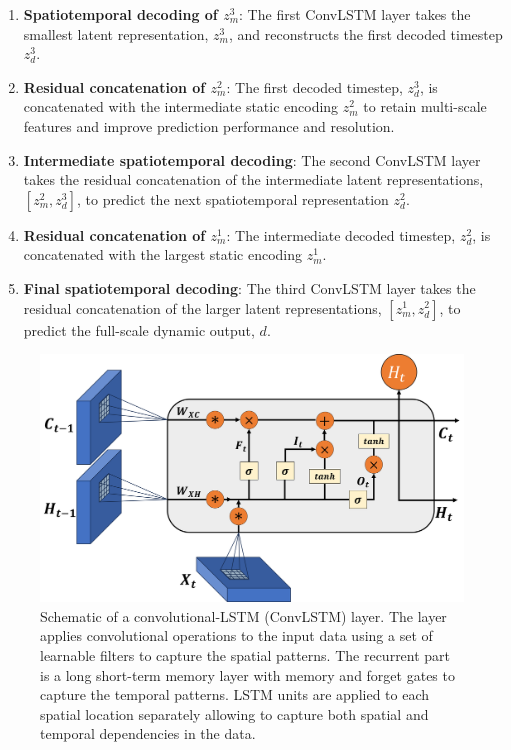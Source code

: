 \documentclass[10pt, twoside]{article}
\begin{document}
\begin{enumerate}[Step 1:]\addtocounter{enumi}{5}
    \item \textbf{Spatiotemporal decoding of $z_m^3$}: The first ConvLSTM layer takes the smallest latent representation, $z_m^3$, and reconstructs the first decoded timestep $z_d^3$.
    
    \item \textbf{Residual concatenation of $z_m^2$}: The first decoded timestep, $z_d^3$, is concatenated with the intermediate static encoding $z_m^2$ to retain multi-scale features and improve prediction performance and resolution.
    
    \item \textbf{Intermediate spatiotemporal decoding}: The second ConvLSTM layer takes the residual concatenation of the intermediate latent representations, $[z_m^2,z_d^3]$, to predict the next spatiotemporal representation $z_d^2$. 
    
    \item \textbf{Residual concatenation of $z_m^1$}: The intermediate decoded timestep, $z_d^2$, is concatenated with the largest static encoding $z_m^1$.
    
    \item \textbf{Final spatiotemporal decoding}: The third ConvLSTM layer takes the residual concatenation of the larger latent representations, $[z_m^1,z_d^2]$, to predict the full-scale dynamic output, $d$.
\end{enumerate}

\begin{figure}[h]
    \centering
    \includegraphics[width=12cm]{figures/convlstm.png}
    \caption{Schematic of a convolutional-LSTM (ConvLSTM) layer. The layer applies convolutional operations to the input data using a set of learnable filters to capture the spatial patterns. The recurrent part is a long short-term memory layer with memory and forget gates to capture the temporal patterns. LSTM units are applied to each spatial location separately allowing to capture both spatial and temporal dependencies in the data. }
    \label{convlstm}
\end{figure}
\end{document}
